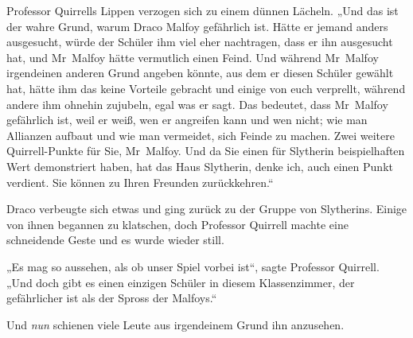 Professor Quirrells Lippen verzogen sich zu einem dünnen Lächeln.
„Und das ist der wahre Grund, warum Draco Malfoy gefährlich ist. Hätte er jemand anders ausgesucht, würde der Schüler ihm viel eher nachtragen, dass er ihn ausgesucht hat, und Mr~Malfoy hätte vermutlich einen Feind. Und während Mr~Malfoy irgendeinen anderen Grund angeben könnte, aus dem er diesen Schüler gewählt hat, hätte ihm das keine Vorteile gebracht und einige von euch verprellt, während andere ihm ohnehin zujubeln, egal was er sagt. Das bedeutet, dass Mr~Malfoy gefährlich ist, weil er weiß, wen er angreifen kann und wen nicht; wie man Allianzen aufbaut und wie man vermeidet, sich Feinde zu machen. Zwei weitere Quirrell-Punkte für Sie, Mr~Malfoy. Und da Sie einen für Slytherin beispielhaften Wert demonstriert haben, hat das Haus Slytherin, denke ich, auch einen Punkt verdient. Sie können zu Ihren Freunden zurückkehren.“

Draco verbeugte sich etwas und ging zurück zu der Gruppe von Slytherins. Einige von ihnen begannen zu klatschen, doch Professor Quirrell machte eine schneidende Geste und es wurde wieder still.

„Es mag so aussehen, als ob unser Spiel vorbei ist“, sagte Professor Quirrell.
„Und doch gibt es einen einzigen Schüler in diesem Klassenzimmer, der gefährlicher ist als der Spross der Malfoys.“

Und \emph{nun} schienen viele Leute aus irgendeinem Grund ihn anzusehen.

